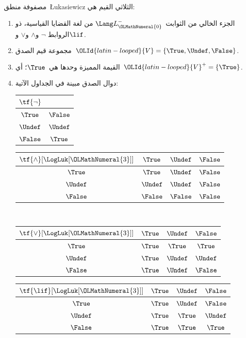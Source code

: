 \documentclass[../../../include/open-logic-section]{subfiles}
\begin{document}
\begin{defn}
مصفوفة منطق~\L ukasiewicz الثلاثي القيم هي:
\begin{enumerate}
  \item الجزء الخالي من الثوابت~$\Lang L_\OLMathNumeral{0}^{-}$ من لغة القضايا القياسية، ذو الروابط
  $\lnot$ و$\land$ و$\lor$ و$\lif$.
  \item مجموعة قيم الصدق~$\OLId{latin-looped}{V} = \{\True, \Undef, \False\}$.
  \item القيمة المميزة وحدها هي~$\True$؛ أي~$\OLId{latin-looped}{V}^+ = \{\True\}$.
  \item دوال الصدق مبينة في الجداول الآتية:
  \begin{center}
    \begin{tabular}{c|c}
      $\tf{\lnot}$ & \\
      \hline
      $\True$ & $\False$ \\
      $\Undef$ & $\Undef$ \\
      $\False$ & $\True$
    \end{tabular}
    \quad
    \begin{tabular}{c|ccc}
      $\tf{\land}[\LogLuk[\OLMathNumeral{3}]]$ & $\True$ & $\Undef$ & $\False$ \\
      \hline
      $\True$ & $\True$ & $\Undef$ & $\False$ \\
      $\Undef$ & $\Undef$ & $\Undef$ & $\False$\\
      $\False$ & $\False$ & $\False$ & $\False$
    \end{tabular}
    \\[2ex]
    \begin{tabular}{c|ccc}
      $\tf{\lor}[\LogLuk[\OLMathNumeral{3}]]$ & $\True$ & $\Undef$ & $\False$ \\
      \hline
      $\True$ & $\True$ & $\True$ & $\True$ \\
      $\Undef$ & $\True$ & $\Undef$ & $\Undef$ \\
      $\False$ & $\True$ & $\Undef$ & $\False$
    \end{tabular}
    \quad
    \begin{tabular}{c|ccc}
      $\tf{\lif}[\LogLuk[\OLMathNumeral{3}]]$ & $\True$ & $\Undef$ & $\False$ \\
      \hline
      $\True$ & $\True$ & $\Undef$ & $\False$ \\
      $\Undef$ & $\True$ & $\True$ & $\Undef$  \\
      $\False$ & $\True$ & $\True$ & $\True$
    \end{tabular}
  \end{center}
\end{enumerate}
\end{defn}
\end{document}
